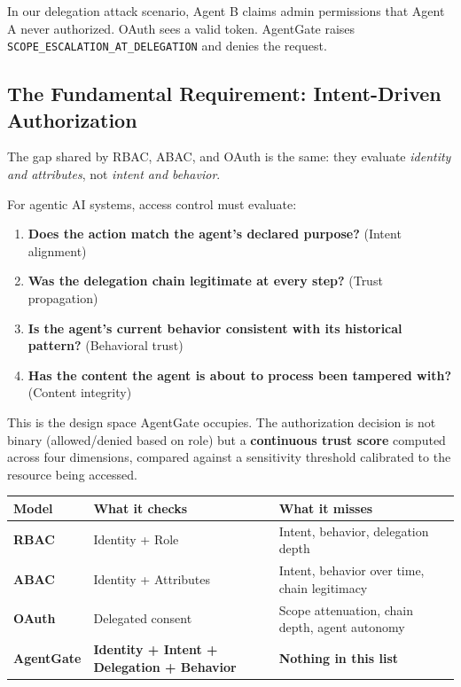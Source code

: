 \documentclass[12pt, a4paper]{article}
\begin{document}
In our delegation attack scenario, Agent B claims admin permissions that Agent A
never authorized. OAuth sees a valid token. AgentGate raises
\texttt{SCOPE\_ESCALATION\_AT\_DELEGATION} and denies the request.

\subsection{The Fundamental Requirement: Intent-Driven Authorization}

The gap shared by RBAC, ABAC, and OAuth is the same: they evaluate
\textit{identity and attributes}, not \textit{intent and behavior}.

For agentic AI systems, access control must evaluate:

\begin{enumerate}[noitemsep]
  \item \textbf{Does the action match the agent's declared purpose?} (Intent alignment)
  \item \textbf{Was the delegation chain legitimate at every step?} (Trust propagation)
  \item \textbf{Is the agent's current behavior consistent with its historical pattern?} (Behavioral trust)
  \item \textbf{Has the content the agent is about to process been tampered with?} (Content integrity)
\end{enumerate}

This is the design space AgentGate occupies. The authorization decision is not
binary (allowed/denied based on role) but a \textbf{continuous trust score}
computed across four dimensions, compared against a sensitivity threshold
calibrated to the resource being accessed.

\vspace{0.3cm}
\begin{tabularx}{\textwidth}{>{\bfseries}l X X}
  \toprule
  Model & What it checks & What it misses \\
  \midrule
  RBAC & Identity + Role & Intent, behavior, delegation depth \\
  ABAC & Identity + Attributes & Intent, behavior over time, chain legitimacy \\
  OAuth & Delegated consent & Scope attenuation, chain depth, agent autonomy \\
  \textbf{AgentGate} & \textbf{Identity + Intent + Delegation + Behavior} & \textbf{Nothing in this list} \\
  \bottomrule
\end{tabularx}
\vspace{0.3cm}
\end{document}
